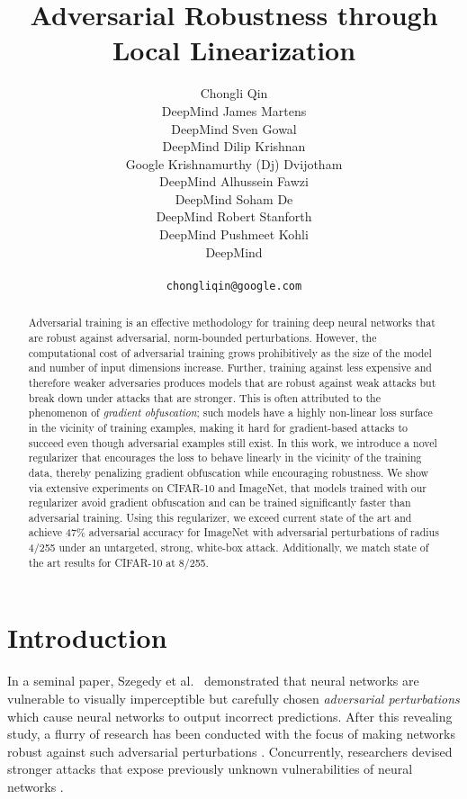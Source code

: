 \documentclass{article}
\title{Adversarial Robustness through Local Linearization}
\author{Chongli Qin\\DeepMind  
  \And 
  James Martens\\DeepMind  
  \And Sven Gowal \\DeepMind
  \And Dilip Krishnan\\Google 
  \And Krishnamurthy (Dj) Dvijotham \\DeepMind 
  \And Alhussein Fawzi \\DeepMind
  \And Soham De \\DeepMind
  \And Robert Stanforth \\DeepMind 
  \And Pushmeet Kohli \\DeepMind 
  \\ \\
  \texttt{chongliqin@google.com} 
}
\theoremstyle{plain}
\theoremstyle{definition}
\theoremstyle{remark}
\begin{document}
\maketitle
\begin{abstract}
    Adversarial training is an effective methodology for training deep neural networks that are robust against adversarial, norm-bounded perturbations. However, the computational cost of adversarial training grows prohibitively as the size of the model and number of input dimensions increase. Further, training against less expensive and therefore weaker adversaries produces models that are robust against weak attacks but break down under attacks that are stronger. This is often attributed to the phenomenon of {\it gradient obfuscation}; such models have a highly non-linear loss surface in the vicinity of training examples, making it hard for gradient-based attacks to succeed even though adversarial examples still exist. In this work, we introduce a novel regularizer that encourages the loss to behave linearly in the vicinity of the training data, thereby penalizing gradient obfuscation while encouraging robustness. We show via extensive experiments on CIFAR-10 and ImageNet, that models trained with our regularizer avoid gradient obfuscation and can be trained significantly faster than adversarial training. Using this regularizer, we exceed current state of the art and achieve 47\% adversarial accuracy for ImageNet with  adversarial perturbations of radius 4/255 under an untargeted, strong, white-box attack. Additionally, we match state of the art results for CIFAR-10 at 8/255.
\end{abstract}
 \section{Introduction}
In a seminal paper, Szegedy et al.~\citep{szegedy2013intriguing} demonstrated that neural networks are vulnerable to visually imperceptible but carefully chosen \emph{adversarial perturbations} which cause neural networks to output incorrect predictions. After this revealing study, a flurry of research has been conducted with the focus of making networks robust against such adversarial perturbations \cite{kurakin2016adversarial, madry2017towards, moosavi2018robustness, xie2018feature}. Concurrently, researchers devised stronger attacks that expose previously unknown vulnerabilities of neural networks \citep{uesato2018adversarial, carlini2017towards, athalye2018obfuscated, carlini2017adversarial}. 
\end{document}
